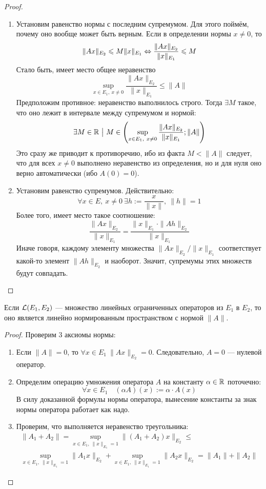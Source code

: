 \begin{proof}
	\begin{enumerate}
		\item Установим равенство нормы с последним супремумом. Для этого поймём, почему оно вообще может быть верным. Если в определении нормы $x \neq 0$, то
		\[
			\|Ax\|_{E_2} \leqslant M\|x\|_{E_1} \Leftrightarrow \frac{\|Ax\|_{E_2}}{\|x\|_{E_1}} \leqslant M
		\]
		Стало быть, имеет место общее неравенство
		\[
			\sup_{x \in E_1,\ x \neq 0} \frac{\|Ax\|_{E_2}}{\|x\|_{E_1}} \le \|A\|
		\]
		Предположим противное: неравенство выполнилось строго. Тогда $\exists M$ такое, что оно лежит в интервале между супремумом и нормой:
		\[
			\exists M \in \mathbb{R} \ \big|\  M \in \left(\sup_{x \in E_1,\ x \neq 0} \frac{\|Ax\|_{E_2}}{\|x\|_{E_1}}; \|A\|\right)
		\]
		Это сразу же приводит к противоречию, ибо из факта $M < \|A\|$ следует, что для всех $x \neq 0$ выполнено неравенство из определения, но и для нуля оно верно автоматически (ибо $A(0) = 0$).
		
		\item Установим равенство супремумов. Действительно:
		\[
			\forall x \in E,\ x \neq 0\ \exists h := \frac{x}{\|x\|},\ \|h\| = 1
		\]
		Более того, имеет место такое соотношение:
		\[
			\frac{\|Ax\|_{E_2}}{\|x\|_{E_1}} = \frac{\|x\|_{E_1} \cdot \|Ah\|_{E_2}}{\|x\|_{E_1}}
		\]
		Иначе говоря, каждому элементу множества $\|Ax\|_{E_2} / \|x\|_{E_1}$ соответствует какой-то элемент $\|Ah\|_{E_2}$ и наоборот. Значит, супремумы этих множеств будут совпадать.
	\end{enumerate}
\end{proof}

\begin{proposition}
	Если $\mathcal{L}(E_1, E_2)$ --- множество линейных ограниченных операторов из $E_1$ в $E_2$, то оно является линейно нормированным пространством с нормой $\|A\|$.
\end{proposition}

\begin{proof}
	Проверим 3 аксиомы нормы:
	\begin{enumerate}
		\item Если $\|A\| = 0$, то $\forall x \in E_1\ \|Ax\|_{E_2} = 0$. Следовательно, $A = 0$ --- нулевой оператор.
		
		\item Определим операцию умножения оператора $A$ на константу $\alpha \in \mathbb{R}$ поточечно:
		\[
			\forall x \in E_1 \quad (\alpha A)(x) := \alpha \cdot A(x)
		\]
		В силу доказанной формулы нормы оператора, вынесение константы за знак нормы оператора работает как надо.
		
		\item Проверим, что выполняется неравенство треугольника:
		\begin{multline*}
			\|A_1 + A_2\| = \sup_{x \in E_1,\ \|x\|_{E_1} = 1} \|(A_1 + A_2)x\|_{E_2} \leq
			\\
			\sup_{x \in E_1,\ \|x\|_{E_1} = 1} \|A_1x\|_{E_2} + \sup_{x \in E_1,\ \|x\|_{E_1} = 1} \|A_2x\|_{E_2} = \|A_1\| + \|A_2\|
		\end{multline*}
	\end{enumerate}
\end{proof}